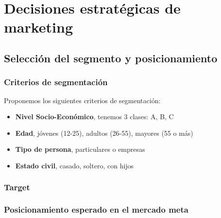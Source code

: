 \chapter{Decisiones estratégicas de marketing}

\section{Selección del segmento y posicionamiento}
\subsection{Criterios de segmentación}
Proponemos los siguientes criterios de segmentación:
\begin{itemize}
    \item \textbf{Nivel Socio-Económico}, tenemos 3 clases: A, B, C
    \item \textbf{Edad}, jóvenes (12-25), adultos (26-55), mayores (55 o más)
    \item \textbf{Tipo de persona}, particulares o empresas
    \item \textbf{Estado civil}, casado, soltero, con hijos
\end{itemize}

\subsection{Target}

\subsection{Posicionamiento esperado en el mercado meta}